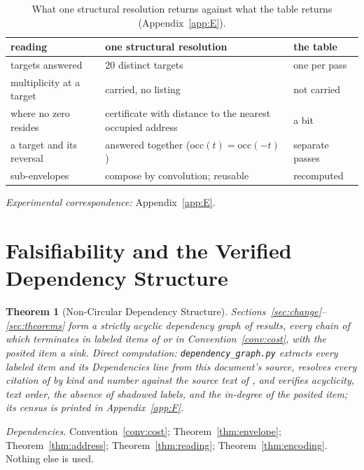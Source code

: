 \documentclass[pdflatex,sn-mathphys-num]{sn-jnl}
\theoremstyle{thmstyleone}%
\newtheorem{theorem}{Theorem}[section]
\theoremstyle{thmstyletwo}%
\theoremstyle{thmstylethree}%
\newtheorem{theorem}{Theorem}[section]
\newcommand{\PA}{\cite{Swanagon2026PA}}
\newcommand{\deps}[1]{\par\begin{sloppypar}\noindent\emph{Dependencies.} #1 Nothing else is used.\end{sloppypar}}
\begin{document}
\begin{table}[!htbp]
\centering\small
\caption{What one structural resolution returns against what the table returns (Appendix~\ref{app:E}).}
\label{tab:surplus}
\begin{tabular}{lll}
\toprule
reading & one structural resolution & the table \\
\midrule
targets answered & 20 distinct targets & one per pass \\
multiplicity at a target & carried, no listing & not carried \\
where no zero resides & certificate with distance to the nearest occupied address & a bit \\
a target and its reversal & answered together (occ$(t)=$occ$(-t)$) & separate passes \\
sub-envelopes & compose by convolution; reusable & recomputed \\
\bottomrule
\end{tabular}
\end{table}

\noindent\emph{Experimental correspondence:} Appendix~\ref{app:E}.

\section{Falsifiability and the Verified Dependency Structure}\label{sec:falsifiability}

\begin{theorem}[Non-Circular Dependency Structure]\label{thm:graph}
Sections~\ref{sec:change}--\ref{sec:theorems} form a strictly acyclic dependency graph of results, every chain of which terminates in labeled items of \PA{} or in Convention~\ref{conv:cost}, with the posited item a sink. Direct computation: \texttt{dependency\_graph.py} extracts every labeled item and its Dependencies line from this document's source, resolves every citation of \PA{} by kind and number against the source text of \PA{}, and verifies acyclicity, text order, the absence of shadowed labels, and the in-degree of the posited item; its census is printed in Appendix~\ref{app:F}.
\end{theorem}
\deps{Convention~\ref{conv:cost}; Theorem~\ref{thm:envelope}; Theorem~\ref{thm:address}; Theorem~\ref{thm:reading}; Theorem~\ref{thm:encoding}.}
\end{document}
